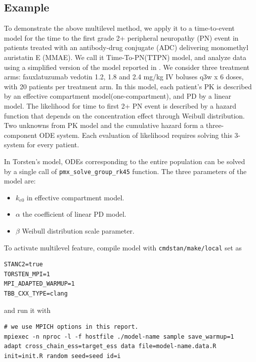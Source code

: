 \documentclass[11pt, reqno, oneside]{amsart}
\begin{document}
\subsection{Example}
\label{sec:orgadc9a94}
To demonstrate the above multilevel method, we apply it to a
time-to-event model for the time to the first grade 2+ peripheral neuropathy (PN)
event in patients treated with an antibody-drug conjugate (ADC)
delivering monomethyl auristatin E (MMAE). We call it
Time-To-PN(TTPN) model, and analyze data using a
simplified version of the model reported in
\cite{lu_time--event_2017}. We consider three treatment arms:
fauxlatuzumab vedotin 1.2, 1.8 and 2.4 mg/kg IV boluses q3w x 6 doses,
with 20 patients per treatment arm. In this model,
each patient's PK is described by an effective compartment model(one-compartment),
and PD by a linear model. The likelihood for time to first 2+ PN event
is described by a hazard function that depends on the concentration
effect through Weibull distribution. Two unknowns from
PK model and the cumulative hazard form a three-component
ODE system. Each evaluation of likelihood requires solving this
3-system for every patient. 

In Torsten's model, ODEs corresponding to the entire
population can be solved by a single call of \texttt{pmx_solve_group_rk45} function. The three parameters of the
model are:
\begin{itemize}
\item \(k_{e0}\) in effective compartment model.
\item \(\alpha\) the coefficient of linear PD model.
\item \(\beta\) Weibull distribution scale parameter.
\end{itemize}

To activate multilevel feature, compile model with \texttt{cmdstan/make/local} set as
\begin{verbatim}
STANC2=true
TORSTEN_MPI=1
MPI_ADAPTED_WARMUP=1
TBB_CXX_TYPE=clang
\end{verbatim}
and run it with
\begin{verbatim}
# we use MPICH options in this report.
mpiexec -n nproc -l -f hostfile ./model-name sample save_warmup=1 adapt cross_chain_ess=target_ess data file=model-name.data.R init=init.R random seed=seed id=i
\end{verbatim}
\end{document}
